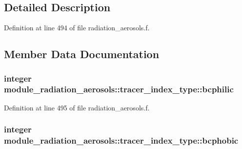 \subsection{Detailed Description}


Definition at line 494 of file radiation\+\_\+aerosols.\+f.



\subsection{Member Data Documentation}
\subsubsection[{\texorpdfstring{bcphilic}{bcphilic}}]{\setlength{\rightskip}{0pt plus 5cm}integer module\+\_\+radiation\+\_\+aerosols\+::tracer\+\_\+index\+\_\+type\+::bcphilic\hspace{0.3cm}{\ttfamily [private]}}\hypertarget{structmodule__radiation__aerosols_1_1tracer__index__type_a776ae744bfaad492a1aeccf32864d1a0}{}\label{structmodule__radiation__aerosols_1_1tracer__index__type_a776ae744bfaad492a1aeccf32864d1a0}


Definition at line 495 of file radiation\+\_\+aerosols.\+f.

\subsubsection[{\texorpdfstring{bcphobic}{bcphobic}}]{\setlength{\rightskip}{0pt plus 5cm}integer module\+\_\+radiation\+\_\+aerosols\+::tracer\+\_\+index\+\_\+type\+::bcphobic\hspace{0.3cm}{\ttfamily [private]}}\hypertarget{structmodule__radiation__aerosols_1_1tracer__index__type_a4b1c1a1b44b5eb68ec19abb48e748fa0}{}\label{structmodule__radiation__aerosols_1_1tracer__index__type_a4b1c1a1b44b5eb68ec19abb48e748fa0}


